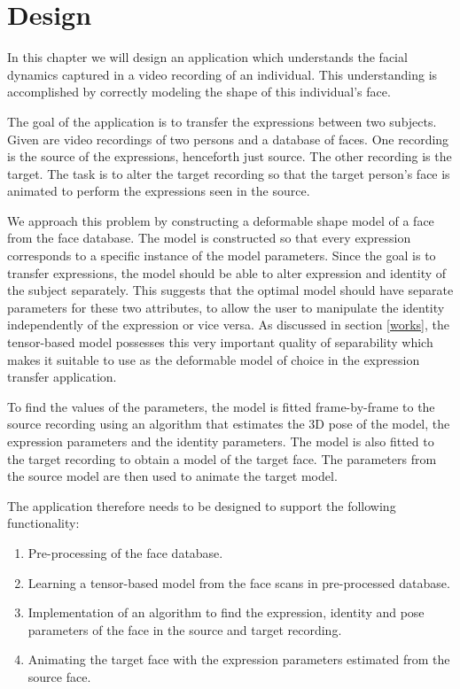 \documentclass[11pt,a4paper,twoside]{report}
\begin{document}
\chapter{Design}\label{design}
In this chapter we will design an application which understands the facial
dynamics captured in a video recording of an individual. This understanding is
accomplished by correctly modeling the shape of this individual's face.

The goal of the application is to transfer the expressions between two
subjects. Given are video recordings of two persons and a database of
faces. One recording is the source of the expressions, henceforth just source. The
other recording is the target. The task is to alter the target recording so that
the target person's face is animated to perform the expressions seen in the
source.

We approach this problem by constructing a deformable shape model of a face from the
face database. The model is constructed so that every expression corresponds to a specific instance of the model
parameters. Since the goal is to transfer expressions, the model should be able
to alter expression and identity of the subject separately. This suggests that the optimal model should have
separate parameters for these two attributes, to allow the user to manipulate
the identity independently of the expression or vice versa.
As discussed in
section \ref{works}, the tensor-based model possesses this very
important quality of separability which makes it suitable to use as the
deformable model of choice in the expression transfer application.

To find the values of the parameters, the model is fitted frame-by-frame to the source recording using an
algorithm that estimates the 3D pose of the model, the expression parameters and
the identity parameters. The model is also fitted to the target recording to obtain a model of the target face. The
parameters from the source model are then used to animate the target model.

The application therefore needs to be designed to support the following functionality:

\begin{enumerate}
\item Pre-processing of the face database.
\item Learning a tensor-based model from the face scans in pre-processed database.
\item Implementation of an algorithm to find the expression, identity and pose
  parameters of the face in the source and target recording.
\item Animating the target face with the expression parameters estimated from
  the source face.
\end{enumerate}
\end{document}
